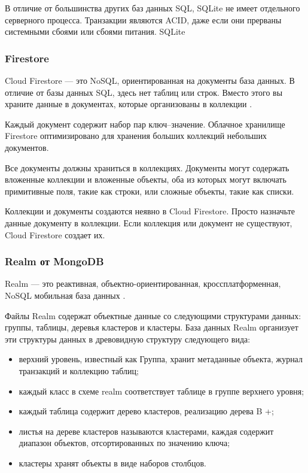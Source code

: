 В отличие от большинства других баз данных SQL, SQLite не имеет отдельного серверного процесса. Транзакции являются ACID, даже если они прерваны системными сбоями или сбоями питания. SQLite 

\subsubsection{Firestore}

Cloud Firestore --- это NoSQL, ориентированная на документы база данных. В отличие от базы данных SQL, здесь нет таблиц или строк. Вместо этого вы храните данные в документах, которые организованы в коллекции \cite{firebase}.

Каждый документ содержит набор пар ключ--значение. Облачное хранилище Firestore оптимизировано для хранения больших коллекций небольших документов.

Все документы должны храниться в коллекциях. Документы могут содержать вложенные коллекции и вложенные объекты, оба из которых могут включать примитивные поля, такие как строки, или сложные объекты, такие как списки.

Коллекции и документы создаются неявно в Cloud Firestore. Просто назначьте данные документу в коллекции. Если коллекция или документ не существуют, Cloud Firestore создает их.

\subsubsection{Realm от MongoDB}

Realm --- это реактивная, объектно-ориентированная, кроссплатформенная, NoSQL мобильная база данных \cite{realm}. 

Файлы Realm содержат объектные данные со следующими структурами данных: группы, таблицы, деревья кластеров и кластеры. База данных Realm организует эти структуры данных в древовидную структуру следующего вида:

\begin{itemize}[label=---]
	\item верхний уровень, известный как Группа, хранит метаданные объекта, журнал транзакций и коллекцию таблиц;
	\item каждый класс в схеме realm соответствует таблице в группе верхнего уровня;
	\item каждый таблица содержит дерево кластеров, реализацию дерева B +;
	\item листья на дереве кластеров называются кластерами, каждая содержит диапазон объектов, отсортированных по значению ключа;
	\item кластеры хранят объекты в виде наборов столбцов.
\end{itemize}


